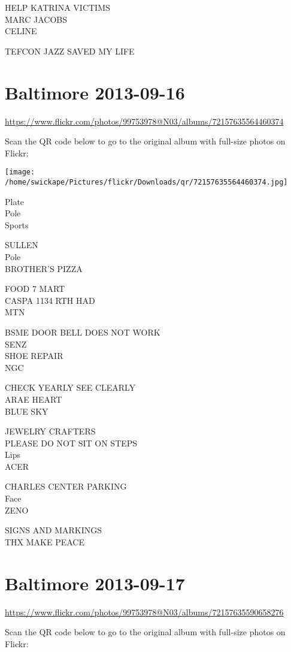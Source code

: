\documentclass[10pt,letterpaper]{article}
\begin{document}
HELP KATRINA VICTIMS\\
MARC JACOBS\\
CELINE

TEFCON JAZZ SAVED MY LIFE


\section*{Baltimore 2013-09-16}

\url{https://www.flickr.com/photos/99753978@N03/albums/72157635564460374}

Scan the QR code below to go to the original album with full-size photos on Flickr:

\texttt{[image: /home/swickape/Pictures/flickr/Downloads/qr/72157635564460374.jpg]}


Plate\\
Pole\\
Sports

SULLEN\\
Pole\\
BROTHER'S PIZZA

FOOD 7 MART\\
CASPA 1134 RTH HAD\\
MTN

BSME DOOR BELL DOES NOT WORK\\
SENZ\\
SHOE REPAIR\\
NGC

CHECK YEARLY SEE CLEARLY\\
ARAE HEART\\
BLUE SKY

JEWELRY CRAFTERS\\
PLEASE DO NOT SIT ON STEPS\\
Lips\\
ACER

CHARLES CENTER PARKING\\
Face\\
ZENO

SIGNS AND MARKINGS\\
THX MAKE PEACE


\section*{Baltimore 2013-09-17}

\url{https://www.flickr.com/photos/99753978@N03/albums/72157635590658276}

Scan the QR code below to go to the original album with full-size photos on Flickr:
\end{document}
